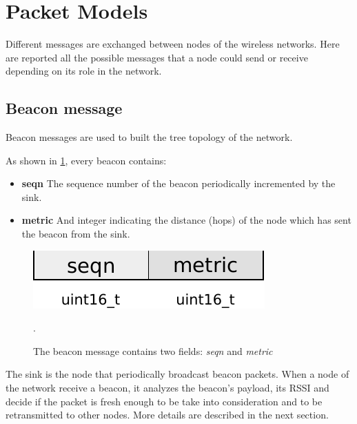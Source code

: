 \section{Packet Models}
\label{sec:packet_model}

Different messages are exchanged between nodes of the wireless networks.
Here are reported all the possible messages that a node could send or receive depending on its role in the network.

\subsection{Beacon message}

Beacon messages are used to built the tree topology of the network.

As shown in \cref{fig:msg_beacon}, every beacon contains:

\begin{itemize}

\item \textbf{seqn} The sequence number of the beacon periodically incremented by the sink.

\item \textbf{metric} And integer indicating the distance (hops) of the node which has sent the beacon from the sink.

\end{itemize}

\begin{figure}[t]
	\centering
	\includegraphics[width=0.5\columnwidth]{res/beacon}
	\caption{The beacon message contains two fields: \textit{seqn}  and \textit{metric}}.
	\label{fig:msg_beacon}
\end{figure}

The sink is the node that periodically broadcast beacon packets.
When a node  of the network receive a beacon, it analyzes the beacon's payload, its RSSI and decide if the packet is fresh enough to be take into consideration and to be retransmitted to other nodes. More details are described in the next section.



